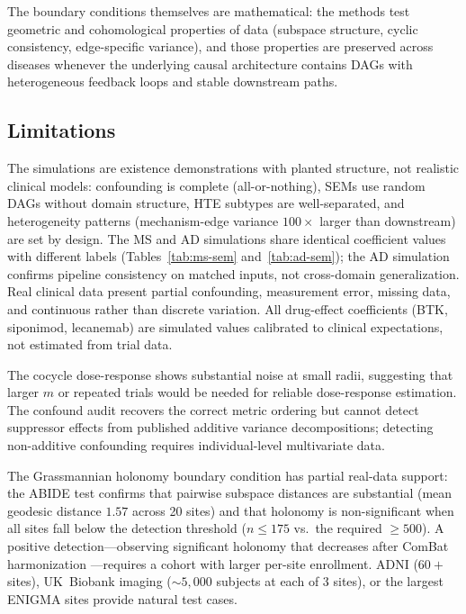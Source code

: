 \documentclass[11pt]{article}
\begin{document}
The boundary conditions themselves are mathematical: the methods test geometric and cohomological properties of data (subspace structure, cyclic consistency, edge-specific variance), and those properties are preserved across diseases whenever the underlying causal architecture contains DAGs with heterogeneous feedback loops and stable downstream paths.


\subsection{Limitations}

The simulations are existence demonstrations with planted structure, not realistic clinical models: confounding is complete (all-or-nothing), SEMs use random DAGs without domain structure, HTE subtypes are well-separated, and heterogeneity patterns (mechanism-edge variance $100\times$ larger than downstream) are set by design.
The MS and AD simulations share identical coefficient values with different labels (Tables~\ref{tab:ms-sem} and~\ref{tab:ad-sem}); the AD simulation confirms pipeline consistency on matched inputs, not cross-domain generalization.
Real clinical data present partial confounding, measurement error, missing data, and continuous rather than discrete variation.
All drug-effect coefficients (BTK, siponimod, lecanemab) are simulated values calibrated to clinical expectations, not estimated from trial data.

The cocycle dose-response shows substantial noise at small radii, suggesting that larger $m$ or repeated trials would be needed for reliable dose-response estimation.
The confound audit recovers the correct metric ordering but cannot detect suppressor effects from published additive variance decompositions; detecting non-additive confounding requires individual-level multivariate data.

The Grassmannian holonomy boundary condition has partial real-data support: the ABIDE test confirms that pairwise subspace distances are substantial (mean geodesic distance $1.57$ across 20 sites) and that holonomy is non-significant when all sites fall below the detection threshold ($n \leq 175$ vs.\ the required $\geq 500$).
A positive detection---observing significant holonomy that decreases after ComBat harmonization \citep{fortin2018harmonization}---requires a cohort with larger per-site enrollment.
ADNI ($60+$ sites), UK~Biobank imaging ($\sim\!5{,}000$ subjects at each of 3 sites), or the largest ENIGMA sites provide natural test cases.
\end{document}
